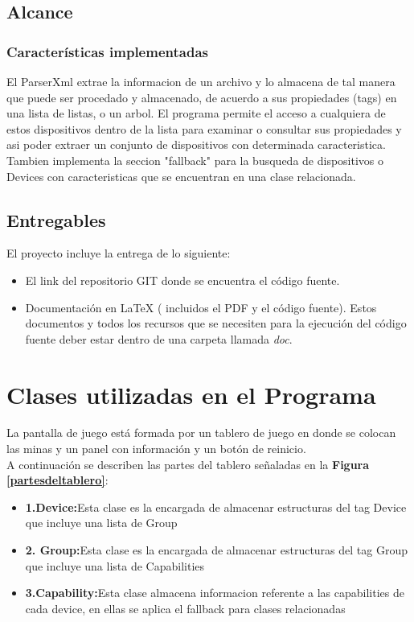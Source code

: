 \documentclass[11pt]{article} %
\begin{document}
\subsection{\textbf{Alcance}}
\subsubsection{\textbf{Caracter\' isticas implementadas}}
El ParserXml extrae la informacion de un archivo y lo almacena de tal manera que puede ser procedado y almacenado, de acuerdo a sus propiedades (tags) en una lista de listas, o un arbol.
El programa permite el acceso a cualquiera de estos dispositivos dentro de la lista para examinar o consultar sus propiedades y asi poder extraer un conjunto de dispositivos con determinada caracteristica.
Tambien implementa la seccion "fallback" para la busqueda de dispositivos o Devices con caracteristicas que se encuentran en una clase relacionada.


\subsection{\textbf{Entregables}}
El proyecto incluye la entrega de lo siguiente:

\begin{itemize}
\item El link del repositorio GIT donde se encuentra el c\'odigo fuente.
\item Documentación en LaTeX ( incluidos el PDF y el c\'odigo fuente). Estos documentos y todos los recursos que se necesiten para la ejecuci\'on del c\'odigo fuente deber estar dentro de una carpeta llamada \textsl{doc}.
\end{itemize}




\newpage
\thispagestyle{empty}

\section{\textbf{Clases utilizadas en el Programa}}



La pantalla de juego est\'a formada por un tablero de juego en donde se colocan las minas y un panel con informaci\'on y un bot\'on de reinicio.
\\A continuaci\'on se describen las partes del tablero se\~naladas en la \textbf{Figura \ref{partesdeltablero}}:

\begin{itemize}

\item \textbf{1.Device:}Esta clase es la encargada de almacenar estructuras del tag Device que incluye una lista de Group
\item \textbf{2. Group:}Esta clase es la encargada de almacenar estructuras del tag Group que incluye una lista de Capabilities
\item \textbf{3.Capability:}Esta clase almacena informacion referente a las capabilities de cada device, en ellas se aplica el fallback para clases relacionadas


\end{itemize}
\end{document}

